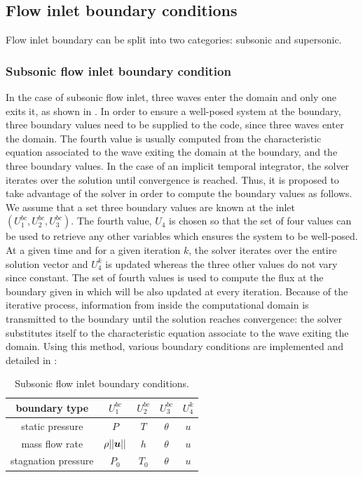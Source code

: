 \subsection{Flow inlet boundary conditions} \label{sec:flow-inlet-bc}
Flow inlet boundary can be split into two categories: subsonic and supersonic.
\subsubsection{Subsonic flow inlet boundary condition} \label{sec:sub-flow-inlet-bc}
In the case of subsonic flow inlet, three waves enter the domain and only one exits it, as shown in . In order to ensure a well-posed system at the boundary, three boundary values need to be supplied to the code, since three waves enter the domain. The fourth value is usually computed from the characteristic equation associated to the wave exiting the domain at the boundary, and the three boundary values. In the case of an implicit temporal integrator, the solver iterates over the solution until convergence is reached. Thus, it is proposed to take advantage of the solver in order to compute the boundary values as follows. We assume that a set three boundary values are known at the inlet $\left(U_1^{bc}, U_2^{bc}, U_3^{bc}\right)$. The fourth value, $U_4$ is chosen so that the set of four values can be used to retrieve any other variables which ensures the system to be well-posed. At a given time and for a given iteration $k$, the solver iterates over the entire solution vector and $U_4^k$ is updated whereas the three other values do not vary since constant. The set of fourth values is used to compute the flux at the boundary given in  which will be also updated at every iteration. Because of the iterative process, information from inside the computational domain is transmitted to the boundary until the solution reaches convergence: the solver substitutes itself to the characteristic equation associate to the wave exiting the domain. Using this method, various boundary conditions are implemented and detailed in :
%
\begin{table}[!htbp]
\begin{center}
\caption{ Subsonic flow inlet boundary conditions.}
\label{tbl:sub-inlet-flow-bc}
\begin{tabular}{|c|c|c|c|c|}
 \hline
boundary type & $U_1^{bc}$  & $U_2^{bc}$ & $U_3^{bc}$ & $U_4^{k}$ \\  \hline
static pressure & $P$     & $T$    & $\theta$  & $u$     \\  \hline
mass flow rate  & $\rho|| \boldsymbol u||$     & $h$  & $\theta$  & $u$     \\  \hline
stagnation pressure & $P_0$  & $T_0$    & $\theta$  & $u$     \\  \hline
\end{tabular}
\end{center}
\end{table}
